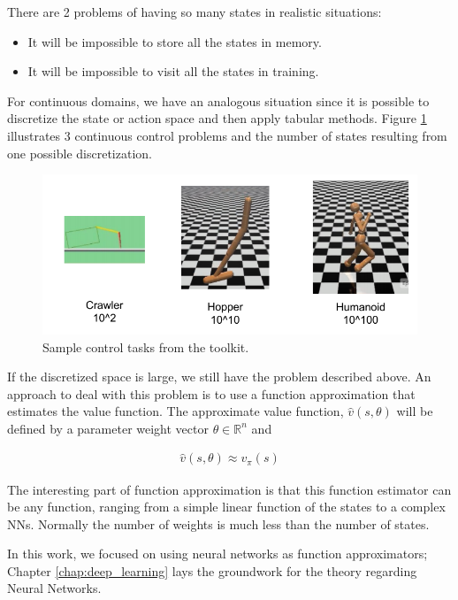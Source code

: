 There are 2 problems of having so many states in realistic situations:

\begin{itemize}
    \item It will be impossible to store all the states in memory.
    \item It will be impossible to visit all the states in training.
\end{itemize}
 
For continuous domains, we have an analogous situation since it is possible to discretize the state or action space and then apply tabular methods.
Figure \ref{fig:continuous} illustrates 3 continuous control problems and the number of states resulting from one possible discretization.

\begin{figure}[ht]
    \centering
    \includegraphics[width=1\textwidth]{Chapter2/continuous.png}
    \caption{Sample control tasks from the \cite{OpenAIGym} toolkit.}
  \label{fig:continuous}
\end{figure}

If the discretized space is large, we still have the problem described above.
An approach to deal with this problem is to use a function approximation that estimates the value function.
The approximate value function, $\hat{v}(s, \theta)$ will be defined by a parameter weight vector $\theta \in \mathbb{R}^n$ and

\begin{align*}
    \hat{v}(s, \theta) \approx v_\pi(s)
\end{align*}

The interesting part of function approximation is that this function estimator can be any function,
 ranging from a simple linear function of the states to a complex NNs.
Normally the number of weights is much less than the number of states.

In this work, we focused on using neural networks as function approximators; Chapter \ref{chap:deep_learning} lays
the groundwork for the theory regarding Neural Networks.

